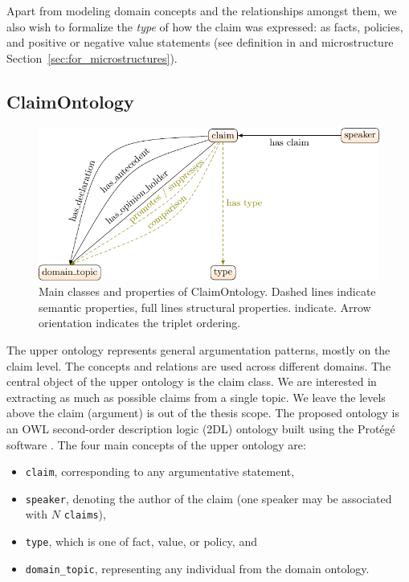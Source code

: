 Apart from modeling domain concepts and the relationships amongst them, we also
wish to formalize the \emph{type} of how the claim was expressed: as facts,
policies, and positive or negative value statements (see definition in
\citep{rieke1997argumentation} and microstructure
Section~\ref{sec:for_microstructures}). 

\subsection{ClaimOntology}
\label{subsec:claimontology}

\begin{figure}
	\centering
	\footnotesize
	\includegraphics{formalizations_main_classes-figure0.pdf}
\caption{Main classes and properties of ClaimOntology. Dashed lines indicate
	semantic properties, full lines structural properties. 
	indicate. Arrow orientation indicates the
	triplet ordering. }
\label{fig:claimontology}
\end{figure}

The upper ontology represents general argumentation patterns, mostly on the
claim level.  The concepts and relations are used across different domains.
The central object of the upper ontology is the claim class. We are interested
in extracting as much as possible claims from a single topic. We leave the
levels above the claim (argument) is out of the thesis scope. The proposed ontology is an
OWL second-order description logic (2DL) ontology built using the
Prot\'{e}g\'{e} software \citep{gennari2003evolution}. The four main concepts
of the upper ontology are:
\begin{itemize}
	\item \texttt{claim}, corresponding to any argumentative statement,
	\item \texttt{speaker},  denoting the author of the claim
		(one speaker may be associated with $N$ \texttt{claims}),
	\item \texttt{type}, which is one of fact, value, or policy, and
	\item \texttt{domain\_topic}, representing any individual from the domain ontology.
\end{itemize}

